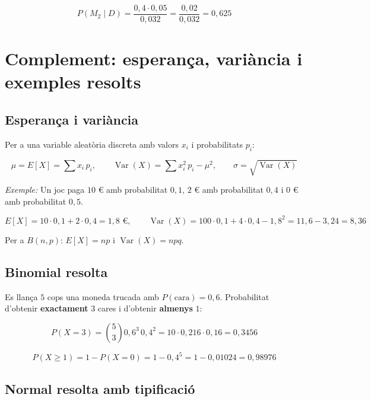 \begin{equation*}
P(M_2\mid D)=\frac{0{,}4\cdot0{,}05}{0{,}032}=\frac{0{,}02}{0{,}032}=0{,}625
\end{equation*}

\section{Complement: esperança, variància i exemples resolts}

\subsection{Esperança i variància}

Per a una variable aleatòria discreta amb valors $x_i$ i probabilitats $p_i$:

\begin{equation*}
\mu=E[X]=\sum x_i\,p_i,\qquad \operatorname{Var}(X)=\sum x_i^2\,p_i-\mu^2,\qquad \sigma=\sqrt{\operatorname{Var}(X)}
\end{equation*}

\emph{Exemple:} Un joc paga $10$ \euro{} amb probabilitat $0{,}1$, $2$ \euro{} amb probabilitat $0{,}4$ i $0$ \euro{} amb probabilitat $0{,}5$.

\begin{equation*}
E[X]=10\cdot0{,}1+2\cdot0{,}4=1{,}8\text{ €},\qquad \operatorname{Var}(X)=100\cdot0{,}1+4\cdot0{,}4-1{,}8^2=11{,}6-3{,}24=8{,}36
\end{equation*}

Per a $B(n,p)$: $E[X]=np$ i $\operatorname{Var}(X)=npq$.

\subsection{Binomial resolta}

Es llança $5$ cops una moneda trucada amb $P(\text{cara})=0{,}6$. Probabilitat d'obtenir \textbf{exactament} $3$ cares i d'obtenir \textbf{almenys} $1$:

\begin{equation*}
P(X=3)=\binom53 0{,}6^3\,0{,}4^2=10\cdot0{,}216\cdot0{,}16=0{,}3456
\end{equation*}

\begin{equation*}
P(X\ge1)=1-P(X=0)=1-0{,}4^5=1-0{,}01024=0{,}98976
\end{equation*}

\subsection{Normal resolta amb tipificació}

